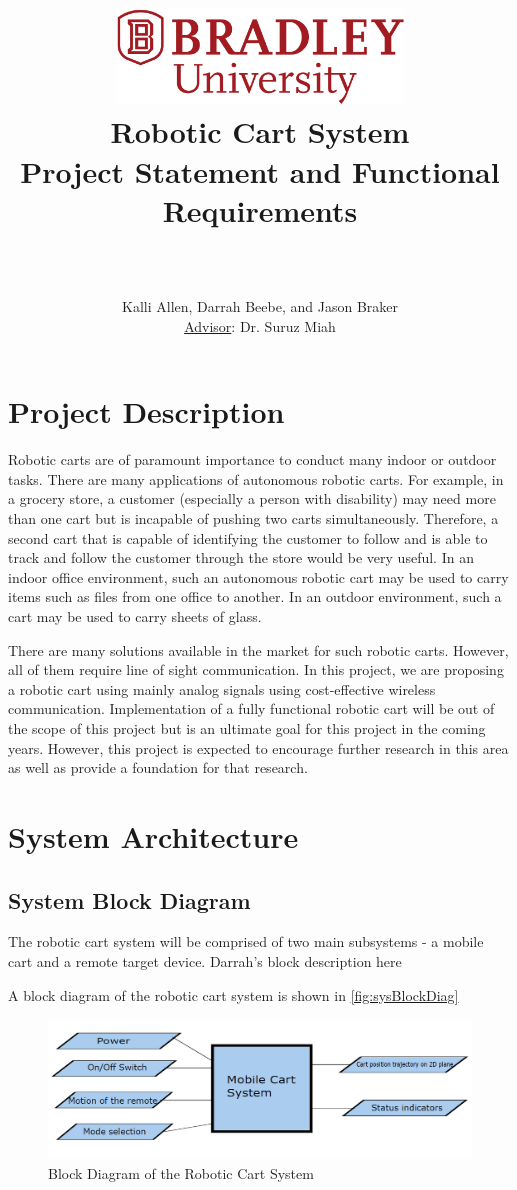 \documentclass[12pt]{article} %
\title{
    \begin{center}
        \href{http://www.bradley.edu}{\includegraphics[height=1in]{figs/logoBU1-Print}}
        \vskip10pt
        \HRule \\[0.4cm]
        {\Huge \bfseries Robotic Cart System \\\Large Project Statement and Functional Requirements}\\[0.4cm] %
        \HRule \\[0.4cm]
    \end{center}
    }
\author{Kalli Allen, Darrah Beebe, and Jason Braker \\ \underline{Advisor}: Dr. Suruz Miah}
\begin{document}
\maketitle

\newpage %

\section{Project Description}
Robotic carts are of paramount importance to conduct many indoor or outdoor tasks. There are many applications of autonomous robotic carts. For example, in a grocery store, a customer (especially a person with disability) may need more than one cart but is incapable of pushing two carts simultaneously. Therefore, a second cart that is capable of identifying the customer to follow and is able to track and follow the customer through the store would be very useful. In an indoor office environment, such an autonomous robotic cart may be used to carry items such as files from one office to another. In an outdoor environment, such a cart may be used to carry sheets of glass.

There are many solutions available in the market for such robotic carts. However, all of them require line of sight communication. In this project, we are proposing a robotic cart using mainly analog signals using cost-effective wireless communication. Implementation of a fully functional robotic cart will be out of the scope of this project but is an ultimate goal for this project in the coming years. However, this project is expected to encourage further research in this area as well as provide a foundation for that research.

\section{System Architecture}
\subsection{System Block Diagram}
The robotic cart system will be comprised of two main subsystems - a mobile cart and a remote target device. \textlangle Darrah's block description here\textrangle

A block diagram of the robotic cart system is shown in \autoref{fig:sysBlockDiag}
\begin{figure}
    \centering
    \captionsetup{justification=centering, margin=3cm}
    \includegraphics[width=6.5in]{figs/img/sysBlockDiag}
    \caption{Block Diagram of the Robotic Cart System}
    \label{fig:sysBlockDiag}
\end{figure}
\end{document}
